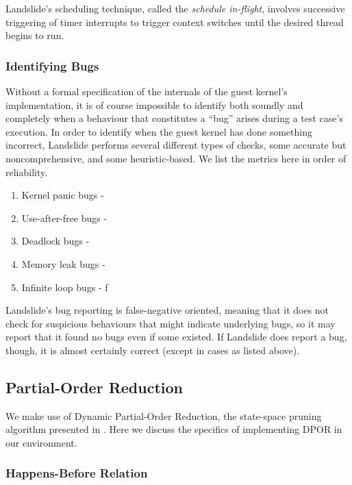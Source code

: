 Landslide's scheduling technique, called the {\em schedule in-flight}, involves successive triggering of timer interrupts to trigger context switches until the desired thread begins to run. %

\subsubsection{Identifying Bugs}

Without a formal specification of the internals of the guest kernel's implementation\cite{sel4}, it is of course impossible to identify both soundly and completely when a behaviour that constitutes a ``bug'' arises during a test case's execution.
In order to identify when the guest kernel has done something incorrect, Landslide performs several different types of checks, some accurate but noncomprehensive, and some heuristic-based.
We list the metrics here in order of reliability.
\begin{enumerate}
	\item Kernel panic bugs - %
	\item Use-after-free bugs - 
	\item Deadlock bugs - 
	\item Memory leak bugs - %
	\item Infinite loop bugs - f
\end{enumerate}
Landslide's bug reporting is false-negative oriented, meaning that it does not check for suspicious behaviours that might indicate underlying bugs, so it may report that it found no bugs even if some existed. If Landslide does report a bug, though, it is almost certainly correct (except in cases as listed above).

\subsection{Partial-Order Reduction}
\label{sec:techniques-por}

We make use of Dynamic Partial-Order Reduction, the state-space pruning algorithm presented in \cite{dpor}. Here we discuss the specifics of implementing DPOR in our environment.

\subsubsection{Happens-Before Relation}

